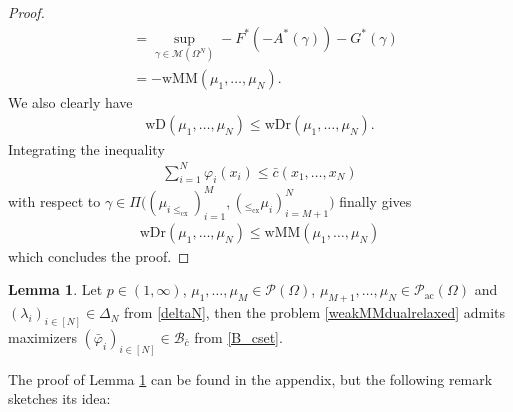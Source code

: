 \documentclass[letterpaper]{amsart}
\theoremstyle{definition}
\newtheorem{lma}[thm]{Lemma}
\begin{document}
\begin{proof}
\begin{align*}
		&=\sup_{\gamma\in\mathcal M(\Omega^N)}-F^*(-A^*(\gamma))-G^*(\gamma)\\
		&=-\text{wMM}(\mu_1,\dots,\mu_N).
	\end{align*}
	We also clearly have
	\begin{gather*}
		\text{wD}(\mu_1,\dots,\mu_N)\leq\text{wDr}(\mu_1,\dots,\mu_N).
	\end{gather*}
	Integrating the inequality
	\begin{gather*}
		\sum_{i=1}^N\varphi_i(x_i)\leq \bar c(x_1,\dots,x_N)
	\end{gather*}
	with respect to $\gamma\in\Pi\big((\mu_{i\leq_{\text{cx}}})_{i=1}^M,(_{\leq_{\text{cx}}}\mu_i)_{i=M+1}^N\big)$ finally gives 
	\begin{gather*}
		\text{wDr}(\mu_1,\dots,\mu_N)\leq\text{wMM}(\mu_1,\dots,\mu_N)
	\end{gather*}
	which concludes the proof.
\end{proof}
\begin{lma}\label{dualattainmentlma}
	Let $p\in (1,\infty)$, $\mu_1,\dots,\mu_M\in\mathcal P(\Omega)$, $\mu_{M+1},\dots,\mu_N\in\mathcal P_{\text{ac}}(\Omega)$ and $(\lambda_i)_{i\in[N]}\in\Delta_N$ from \eqref{deltaN}, then the problem \eqref{weakMMdualrelaxed}
	admits maximizers $(\bar\varphi_i)_{i\in [N]}\in\mathcal B_{\bar c}$ from \eqref{B_cset}.
\end{lma}
The proof of Lemma \ref{dualattainmentlma} can be found in the appendix, but the following remark sketches its idea:
\end{document}

